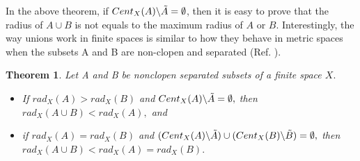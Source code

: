 \documentclass[12pt]{amsart}
\newtheorem{theorem}[definition]{Theorem}
\begin{document}
In the above theorem, if $Cent_{X}(A)\backslash\Tilde{A}=\emptyset$, then it is easy to prove that the  radius of $A\cup B$ is not equals to the maximum radius of $A$ or $B$.  Interestingly, the way unions work in finite spaces is similar to how they behave in metric spaces when the subsets A and B are non-clopen and separated (Ref. \cite{Badra}).


\begin{theorem}\label{2.26}
Let A and B be  nonclopen separated subsets of a finite space $X.$
\begin{itemize}
	\item[(i)]\label{3.31(ii)} If $rad_{X}(A)>rad_{X}(B)$ and $Cent_{X}(A)\backslash\Tilde{A}=\emptyset,$ then $rad_{X}(A\cup B)<rad_{X}(A),$ and
	\item[(ii)]\label{3.31(iv)}  if $rad_{X}(A)=rad_{X}(B)$ and $(Cent_{X}(A)\backslash\Tilde{A})\cup (Cent_{X}(B)\backslash\Tilde{B})=\emptyset,$ then $rad_{X}(A\cup B)< rad_{X}(A)=rad_{X}(B).$ 
\end{itemize} %

\end{theorem}

\end{document}
